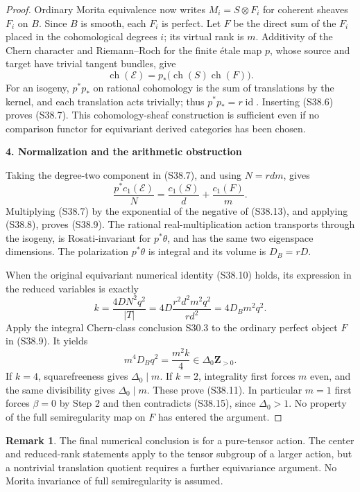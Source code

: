\documentclass[11pt,a4paper]{article}
\theoremstyle{definition}
\newtheorem{remark}[theorem]{Remark}
\begin{document}
\begin{proof}
Ordinary Morita equivalence now writes \(M_i=S\otimes F_i\) for coherent sheaves \(F_i\) on \(B\). Since \(B\) is smooth, each \(F_i\) is perfect. Let \(F\) be the direct sum of the \(F_i\) placed in the cohomological degrees \(i\); its virtual rank is \(m\). Additivity of the Chern character and Riemann--Roch for the finite étale map \(p\), whose source and target have trivial tangent bundles, give \[
 \operatorname{ch}(\mathcal E)
    =p_*\bigl(\operatorname{ch}(S)\operatorname{ch}(F)\bigr).
\] For an isogeny, \(p^*p_*\) on rational cohomology is the sum of translations by the kernel, and each translation acts trivially; thus \(p^*p_*=r\operatorname{id}\). Inserting (S38.6) proves (S38.7). This cohomology-sheaf construction is sufficient even if no comparison functor for equivariant derived categories has been chosen.

\par

\medskip\noindent\textbf{4. Normalization and the arithmetic obstruction}\quad

Taking the degree-two component in (S38.7), and using \(N=rdm\), gives \[
 \frac{p^*c_1(\mathcal E)}N
      =\frac{c_1(S)}d+\frac{c_1(F)}m.
 \tag{S38.13}
\] Multiplying (S38.7) by the exponential of the negative of (S38.13), and applying (S38.8), proves (S38.9). The rational real-multiplication action transports through the isogeny, is Rosati-invariant for \(p^*\theta\), and has the same two eigenspace dimensions. The polarization \(p^*\theta\) is integral and its volume is \(D_B=rD\).

When the original equivariant numerical identity (S38.10) holds, its expression in the reduced variables is exactly \[
 k=\frac{4DN^2q^2}{|T|}
   =4D\frac{r^2d^2m^2q^2}{rd^2}
   =4D_Bm^2q^2.
 \tag{S38.14}
\] Apply the integral Chern-class conclusion S30.3 to the ordinary perfect object \(F\) in (S38.9). It yields \[
 m^4D_Bq^2=\frac{m^2k}{4}\in\Delta_0\mathbf Z_{>0}.
 \tag{S38.15}
\] If \(k=4\), squarefreeness gives \(\Delta_0\mid m\). If \(k=2\), integrality first forces \(m\) even, and the same divisibility gives \(\Delta_0\mid m\). These prove (S38.11). In particular \(m=1\) first forces \(\beta=0\) by Step 2 and then contradicts (S38.15), since \(\Delta_0>1\). No property of the full semiregularity map on \(F\) has entered the argument.
\end{proof}
\begin{remark}
The final numerical conclusion is for a pure-tensor action. The center and reduced-rank statements apply to the tensor subgroup of a larger action, but a nontrivial translation quotient requires a further equivariance argument. No Morita invariance of full semiregularity is assumed.\end{remark}
\end{document}
